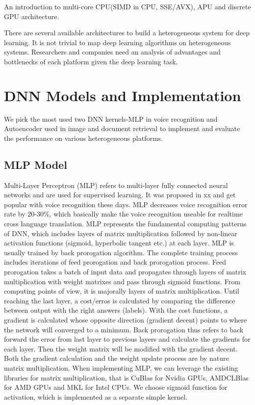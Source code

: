 \documentclass{article}
\begin{document}
An introduction to multi-core CPU(SIMD in CPU, SSE/AVX), APU and discrete GPU architecture.

There are several available architectures to build a heterogeneous system for deep learning.
It is not trivial to map deep learning algorithms on heterogeneous systems.
Researchers and companies need an analysis of advantages and bottlenecks of each platform given the deep learning task.



\section{DNN Models and Implementation}
We pick the most used two DNN kernels-MLP in voice recognition and Autoencoder used in image and document retrieval to implement and evaluate the performance on various heterogeneous platforms.
\subsection{MLP Model}
Multi-Layer Perceptron (MLP) refers to multi-layer fully connected neural networks and are used for supervised learning.
It was proposed in xx and get popular with voice recognition these days.
MLP decreases voice recognition error rate by 20-30\%\cite{microsoft}, which basically make the voice recognition useable for realtime cross language translation.
MLP represents the fundamental computing patterns of DNN, which includes layers of matrix multiplication followed by non-linear activation functions (sigmoid, hyperbolic tangent etc.) at each layer.
MLP is usually trained by back prorogation algorithm. 
The complete training process includes iterations of feed prorogation and back prorogation process.
Feed prorogation takes a batch of input data and propagates through layers of matrix multiplication with weight matrixes and pass through sigmoid functions.
From computing points of view, it is majorally layers of matrix multiplication. Until reaching the last layer, a cost/erros is calculated by comparing the difference between output with the right answers (labels).
With the cost functions, a gradient is calculated whose opposite direction (gradient decent) points to where the network will converged to a minimum.
Back prorogation thus refers to back forward the error from last layer to previous layers and calculate the gradients for each layer. Then the weight matrix will be modified with the gradient decent.
Both the gradient calculation and the weight update process are by nature matrix multiplication.
When implementing MLP, we can leverage the existing libraries for matrix multiplication, that is CuBlas for Nvidia GPUs, AMDCLBlas for AMD GPUs and MKL for Intel CPUs.
We choose sigmoid function for activation, which is implemented as a separate simple kernel.
\end{document}
